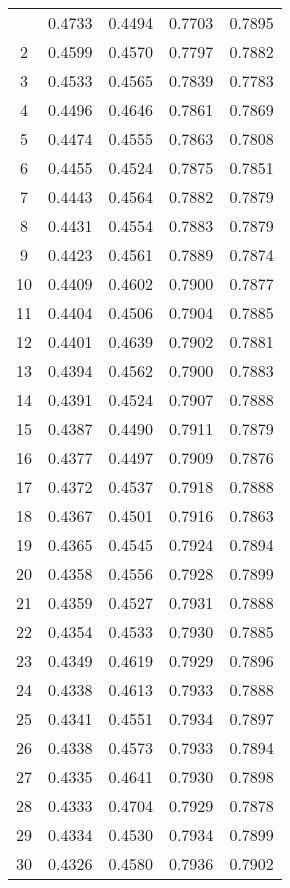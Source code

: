 \documentclass{article}
\begin{document}
\begin{longtable}{c c c c c}
    \hline
    \endlastfoot
    1  & 0.4733 & 0.4494 & 0.7703 & 0.7895 \\
    2  & 0.4599 & 0.4570 & 0.7797 & 0.7882 \\
    3  & 0.4533 & 0.4565 & 0.7839 & 0.7783 \\
    4  & 0.4496 & 0.4646 & 0.7861 & 0.7869 \\
    5  & 0.4474 & 0.4555 & 0.7863 & 0.7808 \\
    6  & 0.4455 & 0.4524 & 0.7875 & 0.7851 \\
    7  & 0.4443 & 0.4564 & 0.7882 & 0.7879 \\
    8  & 0.4431 & 0.4554 & 0.7883 & 0.7879 \\
    9  & 0.4423 & 0.4561 & 0.7889 & 0.7874 \\
    10 & 0.4409 & 0.4602 & 0.7900 & 0.7877 \\
    11 & 0.4404 & 0.4506 & 0.7904 & 0.7885 \\
    12 & 0.4401 & 0.4639 & 0.7902 & 0.7881 \\
    13 & 0.4394 & 0.4562 & 0.7900 & 0.7883 \\
    14 & 0.4391 & 0.4524 & 0.7907 & 0.7888 \\
    15 & 0.4387 & 0.4490 & 0.7911 & 0.7879 \\
    16 & 0.4377 & 0.4497 & 0.7909 & 0.7876 \\
    17 & 0.4372 & 0.4537 & 0.7918 & 0.7888 \\
    18 & 0.4367 & 0.4501 & 0.7916 & 0.7863 \\
    19 & 0.4365 & 0.4545 & 0.7924 & 0.7894 \\
    20 & 0.4358 & 0.4556 & 0.7928 & 0.7899 \\
    21 & 0.4359 & 0.4527 & 0.7931 & 0.7888 \\
    22 & 0.4354 & 0.4533 & 0.7930 & 0.7885 \\
    23 & 0.4349 & 0.4619 & 0.7929 & 0.7896 \\
    24 & 0.4338 & 0.4613 & 0.7933 & 0.7888 \\
    25 & 0.4341 & 0.4551 & 0.7934 & 0.7897 \\
    26 & 0.4338 & 0.4573 & 0.7933 & 0.7894 \\
    27 & 0.4335 & 0.4641 & 0.7930 & 0.7898 \\
    28 & 0.4333 & 0.4704 & 0.7929 & 0.7878 \\
    29 & 0.4334 & 0.4530 & 0.7934 & 0.7899 \\
    30 & 0.4326 & 0.4580 & 0.7936 & 0.7902 \\

\end{longtable}
\end{document}
